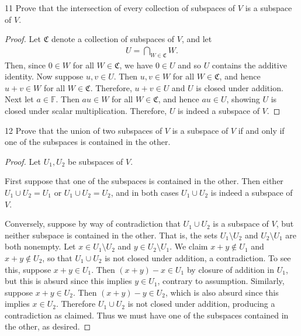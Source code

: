 \documentclass{extarticle}
\newenvironment{problem}[1]{\begin{prob*}{#1}{}}{\end{prob*}}
\newcommand{\F}{\mathbb{F}}
\begin{document}
\begin{problem}{11}
Prove that the intersection of every collection of subspaces of $V$ is a subspace of $V$.
\end{problem}
\begin{proof}
Let $\mathfrak{C}$ denote a collection of subspaces of $V$, and let 
\begin{align*}
U = \bigcap_{W\in \mathfrak{C}}W.
\end{align*}
Then, since $0\in W$ for all $W \in \mathfrak{C}$, we have $0\in U$ and so $U$ contains the additive identity.  Now suppose $u,v\in U$.  Then $u,v\in W$ for all $W\in\mathfrak{C}$, and hence $u+v\in W$ for all $W\in\mathfrak{C}$.  Therefore, $u+v\in U$ and $U$ is closed under addition.  Next let $a\in\F$.  Then $au\in W$ for all $W\in\mathfrak{C}$, and hence $au\in U$, showing $U$ is closed under scalar multiplication.  Therefore, $U$ is indeed a subspace of $V$.
\end{proof}

\begin{problem}{12}
Prove that the union of two subspaces of $V$ is a subspace of $V$ if and only if one of the subspaces is contained in the other.
\end{problem}
\begin{proof}
Let $U_1, U_2$ be subspaces of $V$.  
\par First suppose that one of the subspaces is contained in the other.  Then either $U_1\cup U_2 = U_1$ or $U_1\cup U_2 = U_2$, and in both cases $U_1\cup U_2$ is indeed a subspace of $V$.
\par Conversely, suppose by way of contradiction that $U_1\cup U_2$ is a subspace of $V$, but neither subspace is contained in the other.  That is, the sets $U_1 \setminus U_2$ and $U_2 \setminus U_1$ are both nonempty.  Let $x\in U_1 \setminus U_2$ and $y\in U_2 \setminus U_1$.  We claim $x+y\not\in U_1$ and $x+y\not\in U_2$, so that $U_1\cup U_2$ is not closed under addition, a contradiction.  To see this, suppose $x+y\in U_1$.  Then $(x+y) - x\in U_1$ by closure of addition in $U_1$, but this is absurd since this implies $y\in U_1$, contrary to assumption.  Similarly, suppose $x+y\in U_2$.  Then $(x+y) -y\in U_2$, which is also absurd since this implies $x\in U_2$.  Therefore $U_1\cup U_2$ is not closed under addition, producing a contradiction as claimed.  Thus we must have one of the subspaces contained in the other, as desired.
\end{proof}
\end{document}
